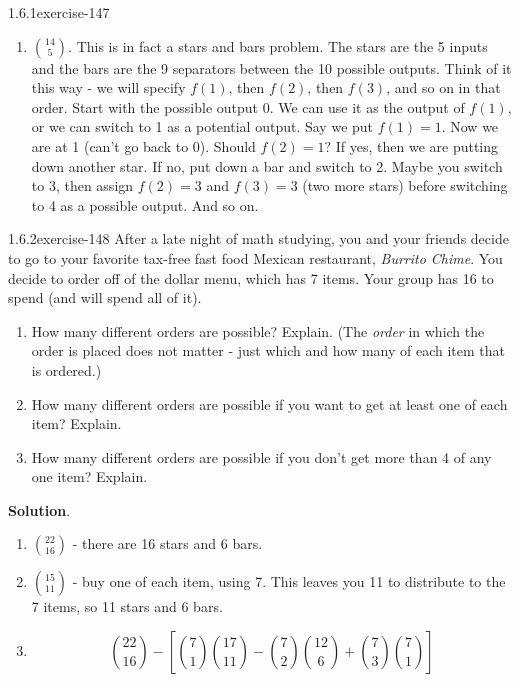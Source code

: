 \documentclass[twoside,11pt,]{book}
\numberwithin{equation}{chapter}
\renewcommand{\d}{\displaystyle}
\begin{document}
\begin{divisionsolution}{1.6.1}{}{exercise-147}
\begin{enumerate}[label=(\alph*)]
\item\hypertarget{li-1485}{}\hypertarget{p-2480}{}%
\({14 \choose 5}\text{.}\) This is in fact a stars and bars problem. The stars are the 5 inputs and the bars are the 9 separators between the 10 possible outputs. Think of it this way - we will specify \(f(1)\text{,}\) then \(f(2)\text{,}\) then \(f(3)\text{,}\) and so on in that order. Start with the possible output 0. We can use it as the output of \(f(1)\text{,}\) or we can switch to 1 as a potential output. Say we put \(f(1) = 1\text{.}\) Now we are at 1 (can't go back to 0). Should \(f(2) = 1\text{?}\) If yes, then we are putting down another star. If no, put down a bar and switch to 2. Maybe you switch to 3, then assign \(f(2) = 3\) and \(f(3) = 3\) (two more stars) before switching to 4 as a possible output. And so on.%
\end{enumerate}
%
\end{divisionsolution}%
\begin{divisionsolution}{1.6.2}{}{exercise-148}%
\hypertarget{p-2481}{}%
After a late night of math studying, you and your friends decide to go to your favorite tax-free fast food Mexican restaurant, \emph{Burrito Chime}. You decide to order off of the dollar menu, which has 7 items. Your group has \textdollar{}16 to spend (and will spend all of it).\leavevmode%
\begin{enumerate}[label=(\alph*)]
\item\hypertarget{li-1486}{}\hypertarget{p-2482}{}%
How many different orders are possible? Explain. (The \emph{order} in which the order is placed does not matter - just which and how many of each item that is ordered.)%
\item\hypertarget{li-1487}{}\hypertarget{p-2483}{}%
How many different orders are possible if you want to get at least one of each item? Explain.%
\item\hypertarget{li-1488}{}\hypertarget{p-2484}{}%
How many different orders are possible if you don't get more than 4 of any one item? Explain.%
\end{enumerate}
%
\par\smallskip%
\noindent\textbf{Solution}.\quad%
\hypertarget{p-2485}{}%
\leavevmode%
\begin{enumerate}[label=(\alph*)]
\item\hypertarget{li-1489}{}\hypertarget{p-2486}{}%
\(\d{22 \choose 16}\) - there are 16 stars and 6 bars.%
\item\hypertarget{li-1490}{}\hypertarget{p-2487}{}%
\(\d{15 \choose 11}\) - buy one of each item, using \textdollar{}7. This leaves you \textdollar{}11 to distribute to the 7 items, so 11 stars and 6 bars.%
\item\hypertarget{li-1491}{}\hypertarget{p-2488}{}%
%
\begin{equation*}
{22 \choose 16} - \left[{7 \choose 1}{17 \choose 11} - {7 \choose 2}{12 \choose 6} + {7 \choose 3}{7 \choose 1} \right]
\end{equation*}
%
\end{enumerate}
%
\end{divisionsolution}%
\end{document}
